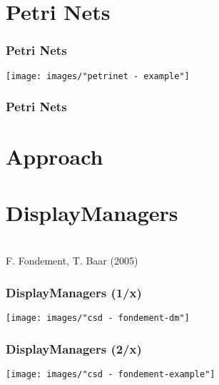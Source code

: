 \section*{Petri Nets}
\begin{frame}
  \frametitle{Petri Nets}

  \centering
  \hspace{-1cm}
  \texttt{[image: images/"petrinet - example"]}
\end{frame}

\begin{frame}
  \frametitle{Petri Nets}
  \hspace*{-.5cm}
\end{frame}


\section{Approach}

\section*{DisplayManagers}
\begin{frame}
  \hspace{-1cm}
  \large
   \\
  \hspace{-1cm}
  \small
  F. Fondement, T. Baar (2005)
\end{frame}


\begin{frame}
  \frametitle{DisplayManagers (1/x)}
  \hspace{-1cm}
  \texttt{[image: images/"csd - fondement-dm"]}
\end{frame}


\begin{frame}
  \frametitle{DisplayManagers (2/x)}
  \hspace{-1cm}
  \texttt{[image: images/"csd - fondement-example"]}
\end{frame}


